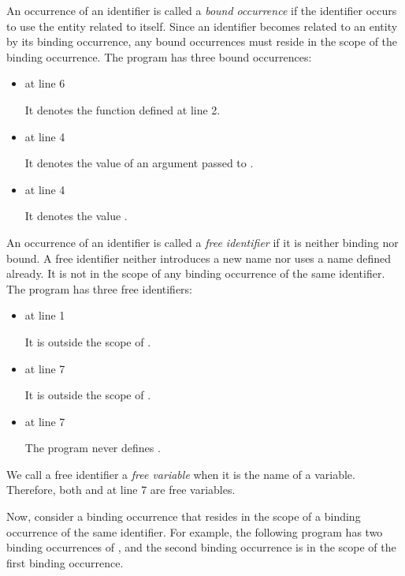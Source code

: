 An occurrence of an identifier is called a \textit{bound occurrence}
if the identifier occurs to use the entity related to itself. Since an
identifier becomes related to an entity by its binding occurrence, any bound
occurrences must reside in the scope of the binding occurrence.
The program has three bound occurrences:

\begin{itemize}
  \item {} at line 6

    It denotes the function defined at line 2.

  \item {} at line 4

    It denotes the value of an argument passed to .

  \item {} at line 4

    It denotes the value .
\end{itemize}

An occurrence of an identifier is called a \textit{free identifier} if it is
neither binding nor bound. A free identifier neither introduces a new name nor
uses a name defined already. It is not in the scope of any binding occurrence of
the same identifier. The program has three free identifiers:

\begin{itemize}
  \item {} at line 1

    It is outside the scope of .

  \item {} at line 7

    It is outside the scope of .

  \item {} at line 7

    The program never defines .
\end{itemize}

We call a free identifier a \textit{free variable} when it
is the name of a variable. Therefore, both  and  at line 7 are
free variables.

Now, consider a binding occurrence that resides in the scope of a binding
occurrence of the same identifier. For example, the following program has two
binding occurrences of , and the second binding occurrence is in the
scope of the first binding occurrence.

